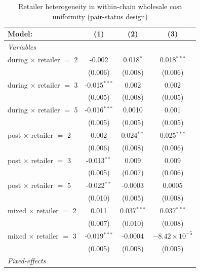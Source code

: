
\begin{table}[htbp]
   \caption{\label{tab:uniformity_heterog_wholesale} Retailer heterogeneity in within-chain wholesale cost uniformity (pair-status design)}
   \centering
   \begin{tabular}{lccc}
      \tabularnewline \midrule \midrule
      Model:                          & (1)            & (2)           & (3)\\  
      \midrule
      \emph{Variables}\\
      during $\times$ retailer $=$ 2  & -0.002         & 0.018$^{*}$   & 0.018$^{***}$\\   
                                      & (0.006)        & (0.008)       & (0.006)\\   
      during $\times$ retailer $=$ 3  & -0.015$^{***}$ & 0.002         & 0.002\\   
                                      & (0.005)        & (0.008)       & (0.005)\\   
      during $\times$ retailer $=$ 5  & -0.016$^{***}$ & 0.0010        & 0.001\\   
                                      & (0.005)        & (0.005)       & (0.005)\\   
      post $\times$ retailer $=$ 2    & 0.002          & 0.024$^{**}$  & 0.025$^{***}$\\   
                                      & (0.006)        & (0.008)       & (0.006)\\   
      post $\times$ retailer $=$ 3    & -0.013$^{**}$  & 0.009         & 0.009\\   
                                      & (0.005)        & (0.007)       & (0.006)\\   
      post $\times$ retailer $=$ 5    & -0.022$^{**}$  & -0.0003       & 0.0005\\   
                                      & (0.010)        & (0.005)       & (0.008)\\   
      mixed $\times$ retailer $=$ 2   & 0.011          & 0.037$^{***}$ & 0.037$^{***}$\\   
                                      & (0.007)        & (0.010)       & (0.008)\\   
      mixed $\times$ retailer $=$ 3   & -0.019$^{***}$ & -0.0004       & $-8.42\times 10^{-5}$\\    
                                      & (0.005)        & (0.008)       & (0.005)\\   
      \midrule
      \emph{Fixed-effects}\\

\end{tabular}
\end{table}
